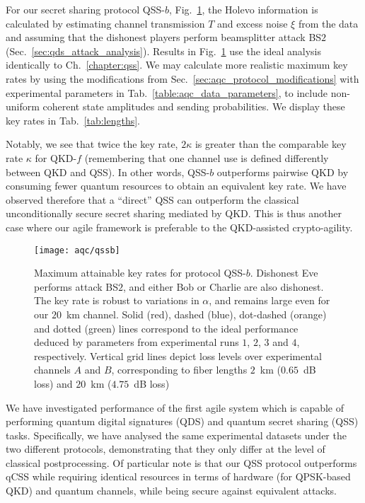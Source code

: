 For our secret sharing protocol QSS-$b$, Fig.~\ref{fig:aqc_qssb}, the Holevo information is calculated by estimating channel transmission $T$ and excess noise $\xi$ from the data and assuming that the dishonest players perform beamsplitter attack BS$2$ (Sec.~\ref{sec:qds_attack_analysis}). Results in Fig.~\ref{fig:aqc_qssb} use the ideal analysis identically to Ch.~\ref{chapter:qss}. We may calculate more realistic maximum key rates by using the modifications from Sec.~\ref{sec:aqc_protocol_modifications} with experimental parameters in Tab.~\ref{table:aqc_data_parameters}, to include non-uniform coherent state amplitudes and sending probabilities. We display these key rates in Tab.~\ref{tab:lengths}.

Notably, we see that twice the key rate, $2 \kappa$ is greater than the comparable key rate $\kappa$ for QKD-$f$ (remembering that one channel use is defined differently between QKD and QSS). In other words, QSS-$b$ outperforms pairwise QKD by consuming fewer quantum resources to obtain an equivalent key rate. We have observed therefore that a ``direct'' QSS can outperform the classical unconditionally secure secret sharing mediated by QKD. This is thus another case where our agile framework is preferable to the QKD-assisted crypto-agility.

\begin{figure}[htp]
\captionsetup{width=0.8\linewidth}
\centering
\texttt{[image: aqc/qssb]}
\caption{\label{fig:aqc_qssb} Maximum attainable key rates for protocol QSS-$b$. Dishonest Eve performs attack BS$2$, and either Bob or Charlie are also dishonest. The key rate is robust to variations in $\alpha$, and remains large even for our $20$~km channel. Solid (red), dashed (blue), dot-dashed (orange) and dotted (green) lines correspond to the ideal performance deduced by parameters from experimental runs $1$, $2$, $3$ and $4$, respectively. Vertical grid lines depict loss levels over experimental channels $A$ and $B$, corresponding to fiber lengths $2$~km ($0.65$~dB loss) and $20$~km ($4.75$~dB loss)}
\end{figure}

We have investigated performance of the first agile system \systemB \; which is capable of performing quantum digital signatures (QDS) and quantum secret sharing (QSS) tasks. Specifically, we have analysed the same experimental datasets under the two different protocols, demonstrating that they only differ at the level of classical postprocessing. Of particular note is that our QSS protocol outperforms qCSS while requiring identical resources in terms of hardware (for QPSK-based QKD) and quantum channels, while being secure against equivalent attacks.


